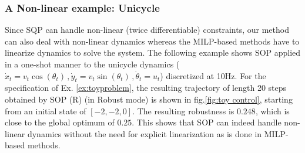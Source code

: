 \subsubsection{A Non-linear example: Unicycle}
\label{sec:nl_unicycle}
Since SQP can handle non-linear (twice differentiable) constraints, our method can also deal with non-linear dynamics whereas the MILP-based methods have to linearize dynamics to solve the system. 
The following example shows SOP applied in a one-shot manner to the unicycle dynamics ($\dot{x}_t=v_t \cos (\theta_t)\, ,\dot{y}_t=v_t \sin (\theta_t)\, ,\dot{\theta}_t= u_t$) discretized at 10Hz.
For the specification of Ex. \ref{ex:toyproblem}, the resulting trajectory of length 20 steps obtained by SOP (R) (in Robust mode) is shown in fig.\ref{fig:toy control}, starting from an initial state of $[-2,-2,0]$. The resulting robustness is $0.248$, which is close to the global optimum of $0.25$. This shows that SOP can indeed handle non-linear dynamics without the need for explicit linearization as is done in MILP-based methods.
